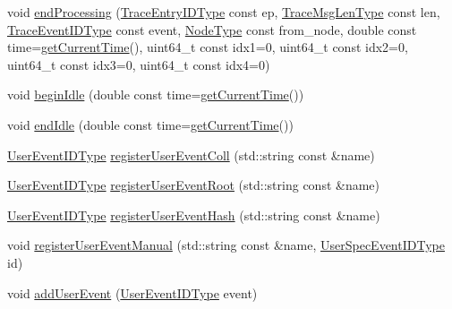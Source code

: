 \begin{DoxyCompactItemize}
\item 
void \hyperlink{structvt_1_1trace_1_1_trace_ad086d14a272d11f16b8eaead65bc685f}{end\+Processing} (\hyperlink{namespacevt_1_1trace_a3c14050715ba9eceaeff51fb3de64f2f}{Trace\+Entry\+I\+D\+Type} const ep, \hyperlink{namespacevt_1_1trace_aeb598f45d67d41db7902e494f2f0ce59}{Trace\+Msg\+Len\+Type} const len, \hyperlink{namespacevt_1_1trace_a64a7185f3e102df8d8258f263ccd1582}{Trace\+Event\+I\+D\+Type} const event, \hyperlink{namespacevt_a866da9d0efc19c0a1ce79e9e492f47e2}{Node\+Type} const from\+\_\+node, double const time=\hyperlink{structvt_1_1trace_1_1_trace_a04cf6b76b4ced1bc90d246a34c948db5}{get\+Current\+Time}(), uint64\+\_\+t const idx1=0, uint64\+\_\+t const idx2=0, uint64\+\_\+t const idx3=0, uint64\+\_\+t const idx4=0)
\item 
void \hyperlink{structvt_1_1trace_1_1_trace_a530af1b7b48cf389744325f6f7e7f05e}{begin\+Idle} (double const time=\hyperlink{structvt_1_1trace_1_1_trace_a04cf6b76b4ced1bc90d246a34c948db5}{get\+Current\+Time}())
\item 
void \hyperlink{structvt_1_1trace_1_1_trace_a0262f4025460c9d61cac60420e75ef77}{end\+Idle} (double const time=\hyperlink{structvt_1_1trace_1_1_trace_a04cf6b76b4ced1bc90d246a34c948db5}{get\+Current\+Time}())
\item 
\hyperlink{namespacevt_1_1trace_a5908920d051c144c89f17c69ed262350}{User\+Event\+I\+D\+Type} \hyperlink{structvt_1_1trace_1_1_trace_a9a106f7f39e605745994d20bb526f8cf}{register\+User\+Event\+Coll} (std\+::string const \&name)
\item 
\hyperlink{namespacevt_1_1trace_a5908920d051c144c89f17c69ed262350}{User\+Event\+I\+D\+Type} \hyperlink{structvt_1_1trace_1_1_trace_a99fcca49a5506c3ee5cda67e541e37cc}{register\+User\+Event\+Root} (std\+::string const \&name)
\item 
\hyperlink{namespacevt_1_1trace_a5908920d051c144c89f17c69ed262350}{User\+Event\+I\+D\+Type} \hyperlink{structvt_1_1trace_1_1_trace_a1b80a8ca6bebbfbe61f8b119342e14f7}{register\+User\+Event\+Hash} (std\+::string const \&name)
\item 
void \hyperlink{structvt_1_1trace_1_1_trace_ade8d39718f60924f1aeb178ccda56cbc}{register\+User\+Event\+Manual} (std\+::string const \&name, \hyperlink{namespacevt_1_1trace_a70c43e0e1596eea236912d4197d3120a}{User\+Spec\+Event\+I\+D\+Type} id)
\item 
void \hyperlink{structvt_1_1trace_1_1_trace_a0a4bbdf7bd3c2b8742cbceb24389a4c0}{add\+User\+Event} (\hyperlink{namespacevt_1_1trace_a5908920d051c144c89f17c69ed262350}{User\+Event\+I\+D\+Type} event)

\end{DoxyCompactItemize}
